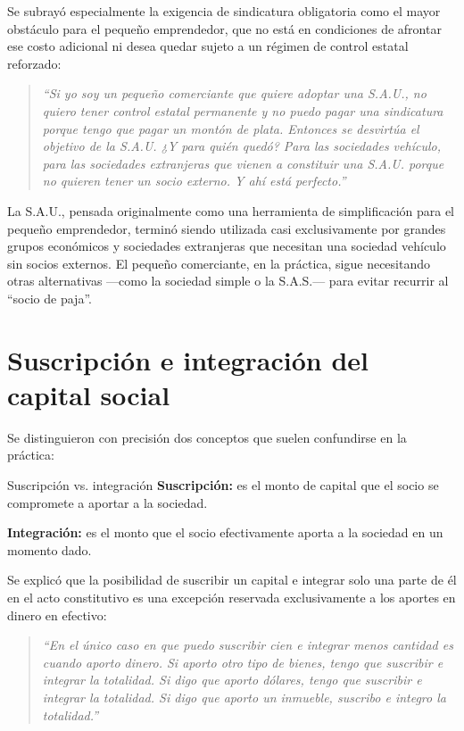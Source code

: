 \documentclass[12pt,oneside]{book}
\begin{document}
Se subrayó especialmente la exigencia de sindicatura obligatoria como el mayor obstáculo para el pequeño emprendedor, que no está en condiciones de afrontar ese costo adicional ni desea quedar sujeto a un régimen de control estatal reforzado:

\begin{quote}
\textit{``Si yo soy un pequeño comerciante que quiere adoptar una S.A.U., no quiero tener control estatal permanente y no puedo pagar una sindicatura porque tengo que pagar un montón de plata. Entonces se desvirtúa el objetivo de la S.A.U. ¿Y para quién quedó? Para las sociedades vehículo, para las sociedades extranjeras que vienen a constituir una S.A.U. porque no quieren tener un socio externo. Y ahí está perfecto.''}
\end{quote}

\begin{important}
La S.A.U., pensada originalmente como una herramienta de simplificación para el pequeño emprendedor, terminó siendo utilizada casi exclusivamente por grandes grupos económicos y sociedades extranjeras que necesitan una sociedad vehículo sin socios externos. El pequeño comerciante, en la práctica, sigue necesitando otras alternativas —como la sociedad simple o la S.A.S.— para evitar recurrir al ``socio de paja''.
\end{important}

\section{Suscripción e integración del capital social}

Se distinguieron con precisión dos conceptos que suelen confundirse en la práctica:

\begin{definition}{Suscripción vs. integración}
\textbf{Suscripción:} es el monto de capital que el socio se compromete a aportar a la sociedad.

\textbf{Integración:} es el monto que el socio efectivamente aporta a la sociedad en un momento dado.
\end{definition}

Se explicó que la posibilidad de suscribir un capital e integrar solo una parte de él en el acto constitutivo es una excepción reservada exclusivamente a los aportes en dinero en efectivo:

\begin{quote}
\textit{``En el único caso en que puedo suscribir cien e integrar menos cantidad es cuando aporto dinero. Si aporto otro tipo de bienes, tengo que suscribir e integrar la totalidad. Si digo que aporto dólares, tengo que suscribir e integrar la totalidad. Si digo que aporto un inmueble, suscribo e integro la totalidad.''}
\end{quote}
\end{document}
